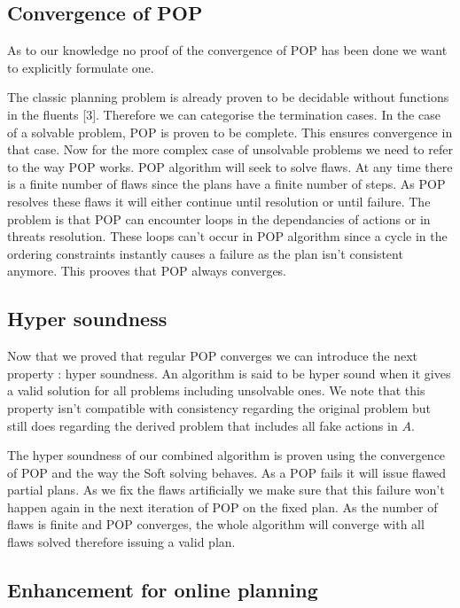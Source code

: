 \documentclass[]{article}
\begin{document}
\subsection{Convergence of POP}\label{convergence}

As to our knowledge no proof of the convergence of POP has been done we
want to explicitly formulate one.

The classic planning problem is already proven to be decidable without
functions in the fluents {[}3{]}. Therefore we can categorise the
termination cases. In the case of a solvable problem, POP is proven to
be complete. This ensures convergence in that case. Now for the more
complex case of unsolvable problems we need to refer to the way POP
works. POP algorithm will seek to solve flaws. At any time there is a
finite number of flaws since the plans have a finite number of steps. As
POP resolves these flaws it will either continue until resolution or
until failure. The problem is that POP can encounter loops in the
dependancies of actions or in threats resolution. These loops can't
occur in POP algorithm since a cycle in the ordering constraints
instantly causes a failure as the plan isn't consistent anymore. This
prooves that POP always converges.

\subsection{Hyper soundness}\label{hypersoundeness}

Now that we proved that regular POP converges we can introduce the next
property : hyper soundness. An algorithm is said to be hyper sound when
it gives a valid solution for all problems including unsolvable ones. We
note that this property isn't compatible with consistency regarding the
original problem but still does regarding the derived problem that
includes all fake actions in \(A\).

The hyper soundness of our combined algorithm is proven using the
convergence of POP and the way the Soft solving behaves. As a POP fails
it will issue flawed partial plans. As we fix the flaws artificially we
make sure that this failure won't happen again in the next iteration of
POP on the fixed plan. As the number of flaws is finite and POP
converges, the whole algorithm will converge with all flaws solved
therefore issuing a valid plan.

\subsection{Enhancement for online
planning}\label{enhancement-for-online-planning}
\end{document}
